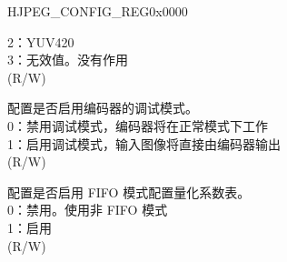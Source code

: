 \begin{register}{H}{JPEG\_CONFIG\_REG}{0x0000}
\begin{regdesc}
\begin{reglist}
2：YUV420\\
3：无效值。没有作用\\
(R/W)
\label{fielddesc:JPEGDEBUGDIRECTOUTEN}\item [JPEG\_DEBUG\_DIRECT\_OUT\_EN] 配置是否启用编码器的调试模式。\\
0：禁用调试模式，编码器将在正常模式下工作\\
1：启用调试模式，输入图像将直接由编码器输出\\
(R/W)
\label{fielddesc:JPEGQNRFIFOEN}\item [JPEG\_QNR\_FIFO\_EN] 配置是否启用 FIFO 模式配置量化系数表。\\
0：禁用。使用非 FIFO 模式\\
1：启用\\
(R/W)

\item [见下页...]
\end{reglist}\end{regdesc}
\end{register}

